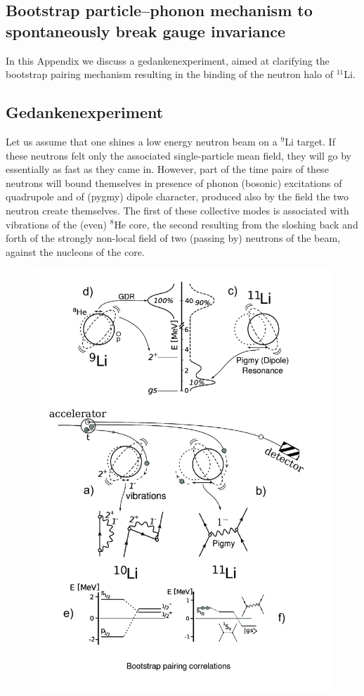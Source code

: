 \begin{subappendices}
\section[Bootstrap mechanism to break gauge invariance]{Bootstrap particle--phonon mechanism to spontaneously break gauge invariance}\label{C8AppA}
In this Appendix we discuss a gedankenexperiment, aimed at clarifying the bootstrap pairing mechanism resulting in the binding of the neutron halo of $^{11}$Li. 
\subsection{Gedankenexperiment}
Let us assume that one shines a  low energy neutron beam on a $^{9}$Li target. If these neutrons felt only the associated single-particle mean field, they will go by essentially as fast as they came in.  However,  part of the time pairs of these neutrons will bound themselves in  presence of phonon (bosonic) excitations of quadrupole and of (pygmy) dipole character, produced also by the field the two neutron create themselves. The first of these collective modes is  associated with vibrations of the (even) $^{8}$He core, the second resulting from the sloshing back and forth of the strongly non-local field of two (passing by) neutrons of the beam,  against the nucleons of the core.
\begin{figure}[h!]
	\begin{center}
		\includegraphics[width=14cm]{C8/figsC8/BootStrap}

\end{center}
\end{figure}
\end{subappendices}
